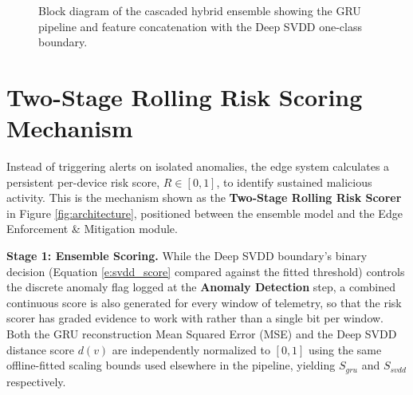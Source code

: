 \begin{figure}[htbp]
\begin{center}
{%
	}
	\end{center}
	\caption{Block diagram of the cascaded hybrid ensemble showing the GRU pipeline and feature concatenation with the Deep SVDD one-class boundary.}
	\label{fig:hybrid_ensemble}
\end{figure}

\FloatBarrier
\section{Two-Stage Rolling Risk Scoring Mechanism}

Instead of triggering alerts on isolated anomalies, the edge system calculates a persistent per-device risk score, $R \in [0,1]$, to identify sustained malicious activity. This is the mechanism shown as the \textbf{Two-Stage Rolling Risk Scorer} in Figure \ref{fig:architecture}, positioned between the ensemble model and the Edge Enforcement \& Mitigation module.

\textbf{Stage 1: Ensemble Scoring.} While the Deep SVDD boundary's binary decision (Equation \ref{e:svdd_score} compared against the fitted threshold) controls the discrete anomaly flag logged at the \textbf{Anomaly Detection} step, a combined continuous score is also generated for every window of telemetry, so that the risk scorer has graded evidence to work with rather than a single bit per window. Both the GRU reconstruction Mean Squared Error (MSE) and the Deep SVDD distance score $d(v)$ are independently normalized to $[0,1]$ using the same offline-fitted scaling bounds used elsewhere in the pipeline, yielding $S_{gru}$ and $S_{svdd}$ respectively.

